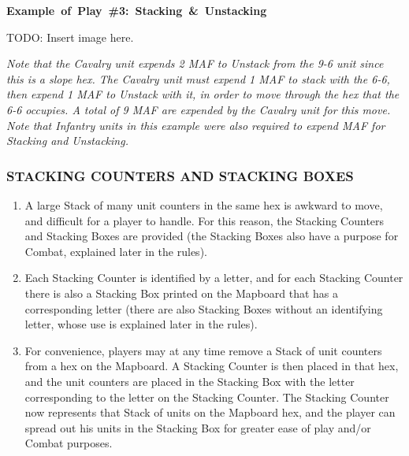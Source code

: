 {\small\noindent\textbf{\mbox{Example of Play \#3: Stacking \& Unstacking}}}

TODO: Insert image here.

\textit{Note that the Cavalry unit expends 2 MAF to Unstack from the 9-6 unit since this is a slope hex. The Cavalry unit must expend 1 MAF to stack with the 6-6, then expend 1 MAF to Unstack with it, in order to move through the hex that the 6-6 occupies. A total of 9 MAF are expended by the Cavalry unit for this move. Note that Infantry units in this example were also required to expend MAF for Stacking and Unstacking.}

\subsubsection{STACKING COUNTERS AND STACKING BOXES}

\begin{enumerate}
  \item A large Stack of many unit counters in the same hex is awkward to move, and difficult for a player to handle. For this reason, the Stacking Counters and Stacking Boxes are provided (the Stacking Boxes also have a purpose for Combat, explained later in the rules).

  \item Each Stacking Counter is identified by a letter, and for each Stacking Counter there is also a Stacking Box printed on the Mapboard that has a corresponding letter (there are also Stacking Boxes without an identifying letter, whose use is explained later in the rules).

  \item For convenience, players may at any time remove a Stack of unit counters from a hex on the Mapboard. A Stacking Counter is then placed in that hex, and the unit counters are placed in the Stacking Box with the letter corresponding to the letter on the Stacking Counter. The Stacking Counter now represents that Stack of units on the Mapboard hex, and the player can spread out his units in the Stacking Box for greater ease of play and/or Combat purposes.
\end{enumerate}
